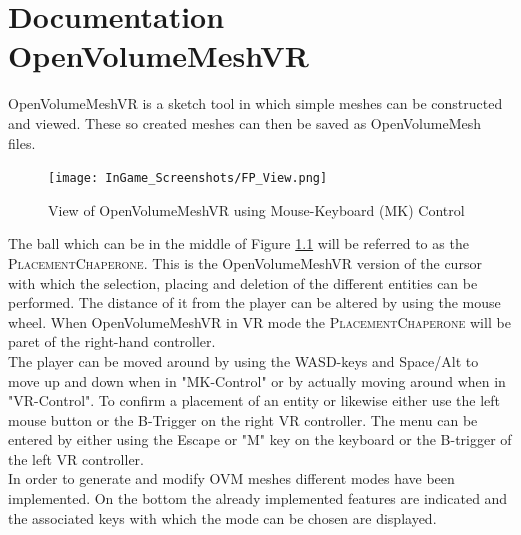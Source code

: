 \documentclass{report}
\begin{document}
\chapter{Documentation OpenVolumeMeshVR}
	OpenVolumeMeshVR is a sketch tool in which simple meshes can be constructed and viewed. These so created meshes can then be saved as OpenVolumeMesh files.
	\begin{figure}[H]
		\begin{center}
			\texttt{[image: InGame\_Screenshots/FP\_View.png]}
			\caption{View of OpenVolumeMeshVR using Mouse-Keyboard (MK) Control}
			\label{FPView}
		\end{center}
	\end{figure}
	\noindent The ball which can be in the middle of Figure \ref{FPView} will be referred to as the \textsc{PlacementChaperone}. This is the OpenVolumeMeshVR version of the cursor with which the selection, placing and deletion of the different entities can be performed. The distance of it from the player can be altered by using the mouse wheel. When OpenVolumeMeshVR in VR mode the \textsc{PlacementChaperone} will be paret of the right-hand controller. \\
	The player can be moved around by using the WASD-keys and Space/Alt to move up and down when in "MK-Control" or by actually moving around when in "VR-Control". To confirm a placement of an entity or likewise either use the left mouse button or the B-Trigger on the right VR controller. The menu can be entered by either using the Escape or "M" key on the keyboard or the B-trigger of the left VR controller. \\
	In order to generate and modify OVM meshes different modes have been implemented. On the bottom the already implemented features are indicated and the associated keys with which the mode can be chosen are displayed.
\end{document}
